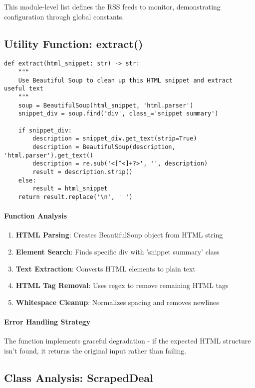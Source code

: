 This module-level list defines the RSS feeds to monitor, demonstrating configuration through global constants.

\subsection{Utility Function: extract()}

\begin{lstlisting}[caption=HTML Text Extraction Function]
def extract(html_snippet: str) -> str:
    """
    Use Beautiful Soup to clean up this HTML snippet and extract useful text
    """
    soup = BeautifulSoup(html_snippet, 'html.parser')
    snippet_div = soup.find('div', class_='snippet summary')
    
    if snippet_div:
        description = snippet_div.get_text(strip=True)
        description = BeautifulSoup(description, 'html.parser').get_text()
        description = re.sub('<[^<]+?>', '', description)
        result = description.strip()
    else:
        result = html_snippet
    return result.replace('\n', ' ')
\end{lstlisting}

\paragraph{Function Analysis}
\begin{enumerate}
\item \textbf{HTML Parsing}: Creates BeautifulSoup object from HTML string
\item \textbf{Element Search}: Finds specific div with 'snippet summary' class
\item \textbf{Text Extraction}: Converts HTML elements to plain text
\item \textbf{HTML Tag Removal}: Uses regex to remove remaining HTML tags
\item \textbf{Whitespace Cleanup}: Normalizes spacing and removes newlines
\end{enumerate}

\paragraph{Error Handling Strategy}
The function implements graceful degradation - if the expected HTML structure isn't found, it returns the original input rather than failing.

\subsection{Class Analysis: ScrapedDeal}

